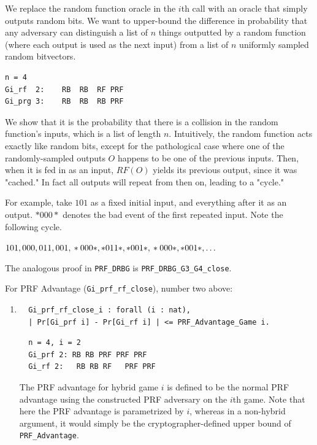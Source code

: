 \documentclass[12pt,lot, lof]{puthesis}
\newcommand{\li} {\lstinline}
\begin{document}
{\begin{enumerate}
  We replace the random function oracle in the $i$th call with an oracle that simply outputs random bits. We want to upper-bound the difference in probability that any adversary can distinguish a list of $n$ things outputted by a random function (where each output is used as the next input) from a list of $n$ uniformly sampled random bitvectors. 
    
  \begin{lstlisting}
n = 4
Gi_rf  2:    RB  RB  RF PRF
Gi_prg 3:    RB  RB  RB PRF
\end{lstlisting}
  
  We show that it is the probability that there is a collision in the random function's inputs, which is a list of length $n$. Intuitively, the random function acts exactly like random bits, except for the pathological case where one of the randomly-sampled outputs $O$ happens to be one of the previous inputs. Then, when it is fed in as an input, $RF(O)$ yields its previous output, since it was "cached." In fact all outputs will repeat from then on, leading to a "cycle." 
  
  For example, take $101$ as a fixed initial input, and everything after it as an output. $*000*$ denotes the bad event of the first repeated input. Note the following cycle.
  
  $101, 000, 011, 001, \\
      *000*, *011*, *001*, \\
      *000*, *001*, \ldots$

  The analogous proof in \li|PRF_DRBG| is \li|PRF_DRBG_G3_G4_close|.
  
\end{enumerate}

For PRF Advantage (\lstinline|Gi_prf_rf_close|), number two above:

\begin{enumerate}
\par
\item 
\begin{lstlisting}
  Gi_prf_rf_close_i : forall (i : nat), 
  | Pr[Gi_prf i] - Pr[Gi_rf i] | <= PRF_Advantage_Game i. 
  \end{lstlisting}
    
  \begin{lstlisting}
  n = 4, i = 2
  Gi_prf 2: RB RB PRF PRF PRF
  Gi_rf 2:   RB RB RF   PRF PRF
  \end{lstlisting}
  
  The PRF advantage for hybrid game $i$ is defined to be the normal PRF advantage using the constructed PRF adversary on the $i$th game. Note that here the PRF advantage is parametrized by $i$, whereas in a non-hybrid argument, it would simply be the cryptographer-defined upper bound of \li|PRF_Advantage|.
 

\end{enumerate}}
\end{document}
